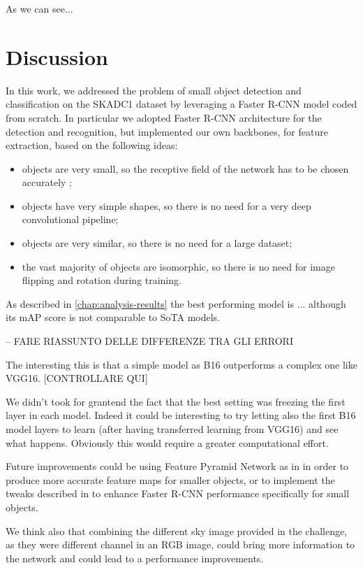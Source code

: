 \documentclass[a4paper,10pt]{report}
\begin{document}
As we can see...

\chapter{Discussion}\label{chap:discussion}

In this work, we addressed the problem of small object detection and classification on the SKADC1 dataset by leveraging a Faster R-CNN model coded from scratch. In particular we adopted Faster R-CNN architecture for the detection and recognition, but implemented our own backbones, for feature extraction, based on the following ideas:
\begin{itemize}
\item objects are very small, so the receptive field of the network has to be chosen accurately \cite{effective-rf};
\item objects have very simple shapes, so there is no need for a very deep convolutional pipeline;
\item objects are very similar, so there is no need for a large dataset;
\item the vast majority of objects are isomorphic, so there is no need for image flipping and rotation during training.
\end{itemize}

As described in \ref{chap:analysis-results} the best performing model is ...
although its mAP score is not comparable to SoTA models.

-- FARE RIASSUNTO DELLE DIFFERENZE TRA GLI ERRORI 

The interesting this is that a simple model as B16 outperforms a complex one like VGG16. [CONTROLLARE QUI]

We didn't took for grantend the fact that the best setting was freezing the first layer in each model. Indeed it could be interesting to try letting also the first B16 model layers to learn (after having transferred learning from VGG16) and see what happens. Obviously this would require a greater computational effort.

Future improvements could be using Feature Pyramid Network as in \cite{fpn} in order to produce more accurate feature maps for smaller objects, or to implement the tweaks described in \cite{frcnn-small-obj} to enhance Faster R-CNN performance specifically for small objects.

We think also that combining the different sky image provided in the challenge, as they were different channel in an RGB image, could bring more information to the network and could lead to a performance improvements.


\printbibliography
\end{document}
